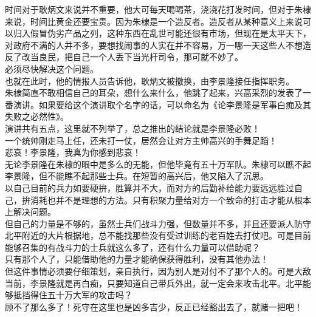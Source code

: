 \begin{multicols}{\theparacolNo}
时间对于耿炳文来说并不重要，他大可每天喝喝茶，浇浇花打发时间，但对于朱棣来说，时间比黄金还要宝贵。因为朱棣是一个造反者。造反者从某种意义上来说可以归入假冒伪劣产品之列，这种东西在乱世可能还很有市场，但现在是太平天下，对政府不满的人并不多，要想找闹事的人实在并不容易，万一哪一天这些人不想造反了改当良民，把自己一个人丢下当光杆司令，那可就不妙了。\\

必须尽快解决这个问题。\\

也就在此时，他的情报人员告诉他，耿炳文被撤换，由李景隆接任指挥职务。\\

朱棣简直不敢相信自己的耳朵，想什么来什么，他跳了起来，兴高采烈的发表了一番演讲。如果要给这个演讲取个名字的话，可以命名为《论李景隆是军事白痴及其失败之必然性》。\\

演讲共有五点，这里就不列举了，总之推出的结论就是李景隆必败！\\

一个统帅刚走马上任，还未打一仗，居然会让对方主帅高兴的手舞足蹈！\\

悲哀！李景隆，我真为你感到悲哀！\\

无论李景隆在朱棣的眼中是多么的无能，但他毕竟有五十万军队。朱棣可以瞧不起李景隆，但不能瞧不起那些士兵。在短暂的高兴后，他又陷入了沉思。\\

以自己目前的兵力如要硬拚，胜算并不大，而对方的后勤补给能力要远远胜过自己，拚消耗也并不是理想的方法。只有积聚力量给对方一个致命的打击才能从根本上解决问题。\\

但自己的力量是不够的，虽然士兵们战斗力强，但数量并不多，并且还要派人防守北平附近的大片根据地，总不能找那些没有受过训练的老百姓去打仗吧。可是目前能够召集的有战斗力的士兵就这么多了，还有什么力量可以借助呢？\\

只有那个人了，只能借助他的力量才能确保获得胜利，没有其他办法！\\

但这件事情必须要仔细策划，亲自执行，因为别人是对付不了那个人的。可是大敌当前，李景隆就是再白痴，只要知道自己带兵外出，就一定会来攻击北平。北平能够抵挡得住五十万大军的攻击吗？\\

顾不了那么多了！死守在这里也是凶多吉少，反正已经豁出去了，就赌一把吧！\\


\end{multicols}
